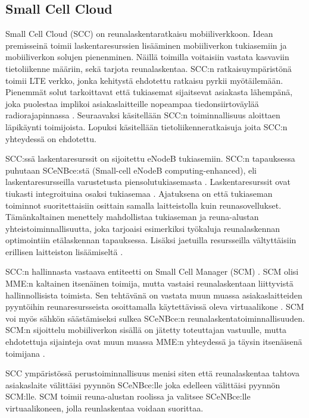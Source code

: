 

\subsection{Small Cell Cloud} \label{scc}

Small Cell Cloud (SCC) on reunalaskentaratkaisu mobiiliverkkoon.
Idean premisseinä toimii laskentaresurssien lisääminen mobiiliverkon tukiasemiin ja mobiiliverkon solujen pienenminen.
Näillä toimilla voitaisiin vastata kasvaviin tietoliikenne määriin, sekä tarjota reunalaskentaa.
SCC:n ratkaisuympäristönä toimii LTE verkko, jonka kehitystä ehdotettu ratkaisu pyrkii myötäilemään.
Pienemmät solut tarkoittavat että tukiasemat sijaitsevat asiakasta lähempänä, joka puolestaa implikoi asiakaslaitteille nopeampaa tiedonsiirtoväylää radiorajapinnassa \cite{lobillo15scc}.
Seuraavaksi käsitellään SCC:n toiminnallisuus aloittaen läpikäynti toimijoista. Lopuksi käsitellään tietoliikenneratkaisuja joita SCC:n yhteydessä on ehdotettu.

SCC:ssä laskentaresurssit on sijoitettu eNodeB tukiasemiin. SCC:n tapauksessa puhutaan SCeNBce:stä (Small-cell eNodeB computing-enhanced), eli laskentaresursseilla varustetusta piensolutukiasemasta \cite{lobillo15scc}.
Laskentaresurssit ovat tiukasti integroituina osaksi tukiasemaa \cite{puente15seamless}.
Ajatuksena on että tukiaseman toiminnot suoritettaisiin osittain samalla laitteistolla kuin reunasovellukset.
Tämänkaltainen menettely mahdollistaa tukiaseman ja reuna-alustan yhteistoiminnallisuutta, joka tarjoaisi esimerkiksi työkaluja reunalaskennan optimointiin etälaskennan tapauksessa.
Lisäksi jaetuilla resursseilla vältyttäisiin erillisen laitteiston lisäämiseltä \cite{puente15seamless}.

SCC:n hallinnasta vastaava entiteetti on Small Cell Manager (SCM) \cite{lobillo15scc}.
SCM olisi MME:n kaltainen itsenäinen toimija, mutta vastaisi reunalaskentaan liittyvistä hallinnollisista toimista.
Sen tehtävänä on vastata muun muassa asiakaslaitteiden pyyntöihin reunaresursseista osoittamalla käytettävissä oleva virtuaalikone \cite{dolezal2016performance}.
SCM voi myös sähkön säästämiseksi sulkea SCeNBce:n reunalaskentatoiminnallisuuden.
SCM:n sijoittelu mobiiliverkon sisällä on jätetty toteuttajan vastuulle, mutta ehdotettuja sijainteja ovat muun muassa MME:n yhteydessä ja täysin itsenäisenä toimijana \cite{lobillo15scc}.

SCC ympäristössä perustoiminnallisuus menisi siten että reunalaskentaa tahtova asiakaslaite välittäisi pyynnön SCeNBce:lle joka edelleen välittäisi pyynnön SCM:lle.
SCM toimii reuna-alustan roolissa ja valitsee SCeNBce:lle virtuaalikoneen, jolla reunlaskentaa voidaan suorittaa. \cite{dolezal2016performance}


